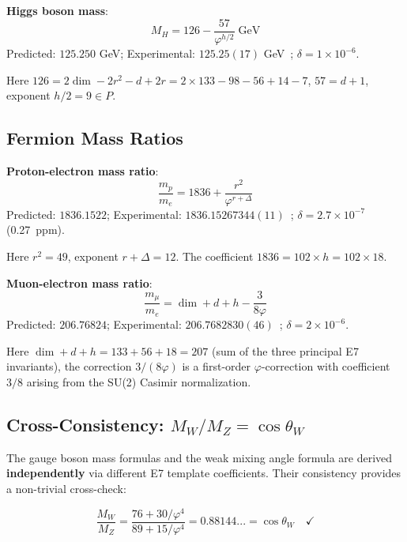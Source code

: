 \documentclass[11pt,a4paper]{article}
\begin{document}
\textbf{Higgs boson mass}:
\begin{equation}
\boxed{M_H = 126 - \frac{57}{\varphi^{h/2}} \;\text{GeV}}
\end{equation}
Predicted: $125.250$ GeV; Experimental: $125.25(17)$ GeV~\cite{PDG2024}; \textbf{$\delta = 1 \times 10^{-6}$}.

Here $126 = 2\dim - 2r^2 - d + 2r = 2 \times 133 - 98 - 56 + 14 - 7$, $57 = d + 1$, exponent $h/2 = 9 \in P$.

\subsection{Fermion Mass Ratios}

\textbf{Proton-electron mass ratio}:
\begin{equation}
\boxed{\frac{m_p}{m_e} = 1836 + \frac{r^2}{\varphi^{r+\Delta}}}
\end{equation}
Predicted: $1836.1522$; Experimental: $1836.15267344(11)$~\cite{CODATA2022}; \textbf{$\delta = 2.7 \times 10^{-7}$} (0.27~ppm).

Here $r^2 = 49$, exponent $r + \Delta = 12$. The coefficient $1836 = 102 \times h = 102 \times 18$.

\textbf{Muon-electron mass ratio}:
\begin{equation}
\boxed{\frac{m_\mu}{m_e} = \dim + d + h - \frac{3}{8\varphi}}
\end{equation}
Predicted: $206.76824$; Experimental: $206.7682830(46)$~\cite{CODATA2022}; \textbf{$\delta = 2 \times 10^{-6}$}.

Here $\dim + d + h = 133 + 56 + 18 = 207$ (sum of the three principal E7 invariants), the correction $3/(8\varphi)$ is a first-order $\varphi$-correction with coefficient $3/8$ arising from the SU(2) Casimir normalization.

\subsection{Cross-Consistency: $M_W/M_Z = \cos\theta_W$}

The gauge boson mass formulas and the weak mixing angle formula are derived \textbf{independently} via different E7 template coefficients. Their consistency provides a non-trivial cross-check:

\begin{equation}
\frac{M_W}{M_Z} = \frac{76 + 30/\varphi^4}{89 + 15/\varphi^{4}} = 0.88144... = \cos\theta_W \quad \checkmark
\end{equation}
\end{document}
